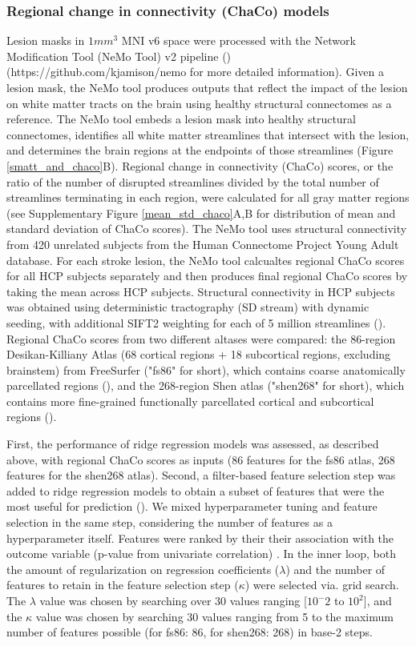 \documentclass[phd,tocprelim]{cornell}
\def\Plus{\texttt{+}}
\begin{document}
\subsubsection{Regional change in connectivity (ChaCo) models}
Lesion masks in $1mm^3$ MNI v6 space were processed with the Network Modification Tool (NeMo Tool) v2 pipeline (\cite{Kuceyeski2013-nk}) (https://github.com/kjamison/nemo for more detailed information). Given a lesion mask, the NeMo tool produces outputs that reflect the impact of the lesion on white matter tracts on the brain using healthy structural connectomes as a reference. The NeMo tool embeds a lesion mask into healthy structural connectomes, identifies all white matter streamlines that intersect with the lesion, and determines the brain regions at the endpoints of those streamlines (Figure \ref{smatt_and_chaco}B). Regional change in connectivity (ChaCo) scores, or the ratio of the number of disrupted streamlines divided by the total number of streamlines terminating in each region, were calculated for all gray matter regions (see Supplementary Figure \ref{mean_std_chaco}A,B for distribution of mean and standard deviation of ChaCo scores). The NeMo tool uses structural connectivity from 420 unrelated subjects from the Human Connectome Project Young Adult database. For each stroke lesion, the NeMo tool calcualtes regional ChaCo scores for all HCP subjects separately and then produces final regional ChaCo scores by taking the mean across HCP subjects. Structural connectivity in HCP subjects was obtained using deterministic tractography (SD stream) with dynamic seeding, with additional SIFT2 weighting for each of 5 million streamlines (\cite{Smith2015-eb}). Regional ChaCo scores from two different altases were compared: the 86-region Desikan-Killiany Atlas (68 cortical regions $\Plus$ 18 subcortical regions, excluding brainstem) from FreeSurfer ("fs86" for short), which contains coarse anatomically parcellated regions (\cite{Desikan2006-vf,Fischl2002-lb}), and the 268-region Shen atlas ("shen268" for short), which contains more fine-grained functionally parcellated cortical and subcortical regions (\cite{Shen2013-zn}).

First, the performance of ridge regression models was assessed, as described above, with regional ChaCo scores as inputs (86 features for the fs86 atlas, 268 features for the shen268 atlas). Second, a filter-based feature selection step was added to ridge regression models to obtain a subset of features that were the most useful for prediction (\cite{Guyon2003-kj, Hall1999-qr, Pudjihartono2022-zg}). We mixed hyperparameter tuning and feature selection in the same step, considering the number of features as a hyperparameter itself. Features were ranked by their their association with the outcome variable (p-value from univariate correlation) . In the inner loop, both the amount of regularization on regression coefficients ($\lambda$) and the number of features to retain in the feature selection step ($\kappa$) were selected via. grid search. The $\lambda$ value was chosen by searching over 30 values ranging [$10^-2$ to $10^2$], and the $\kappa$ value was chosen by searching 30 values ranging from 5 to the maximum number of features possible (for fs86: 86, for shen268: 268) in base-2 steps. 
\end{document}
